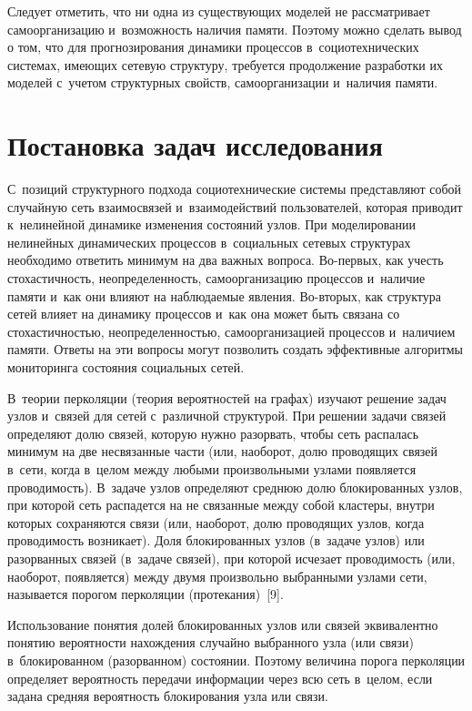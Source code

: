 \begin{multicols}{2}
  Следует отметить, что ни одна из существующих моделей не рассматривает 
самоорганизацию и~возможность наличия памяти. Поэтому можно сделать 
вывод о том, что для прогнозирования динамики процессов в~социотехнических 
системах, имеющих сетевую структуру, требуется продолжение разработки их 
моделей с~учетом структурных свойств, самоорганизации и~наличия памяти.

\vspace*{-3pt}
  
\section{Постановка задач исследования}

   С~позиций структурного подхода социотехнические системы представляют 
собой случайную сеть взаимосвязей и~взаимодействий пользователей, которая 
приводит к~нелинейной динамике изменения состояний узлов. При 
моделировании нелинейных динамических процессов в~социальных сетевых 
структурах необходимо ответить минимум на два важных вопроса.  
Во-пер\-вых, как учесть стохастичность, неопределенность, самоорганизацию 
процессов и~наличие памяти и~как они влияют на наблюдаемые явления.  
Во-вто\-рых, как структура сетей влияет на динамику процессов и~как она 
может быть связана со стохастичностью, неопределенностью, 
самоорганизацией процессов и~наличием памяти. Ответы на эти вопросы могут 
позволить создать эффективные алгоритмы мониторинга состояния социальных 
сетей.
   
  В~теории перколяции (теория вероятностей на графах) изучают решение 
задач узлов и~связей для сетей с~различной структурой. При решении задачи 
связей определяют долю связей, которую нужно разорвать, чтобы сеть 
распалась минимум на две несвязанные части (или, наоборот, долю 
проводящих связей в~сети, когда в~целом между любыми произвольными 
узлами появляется проводимость). В~задаче узлов определяют среднюю долю 
блокированных узлов, при которой сеть распадется на не связанные между 
собой кластеры, внутри которых сохраняются связи (или, наоборот, долю 
проводящих узлов, когда проводимость возникает). Доля блокированных узлов 
(в~задаче узлов) или разорванных связей (в~задаче связей), при которой 
исчезает проводимость (или, наоборот, появляется) между двумя произвольно 
выбранными узлами сети, называется порогом перколяции (протекания)~[9].
  
  Использование понятия долей блокированных узлов или связей эквивалентно 
понятию вероятности нахождения случайно выбранного узла (или связи) 
в~блокированном (разорванном) состоянии. Поэтому величина порога 
перколяции определяет вероятность передачи информации через всю сеть 
в~целом, если задана средняя вероятность блокирования узла или связи.
  

\end{multicols}
